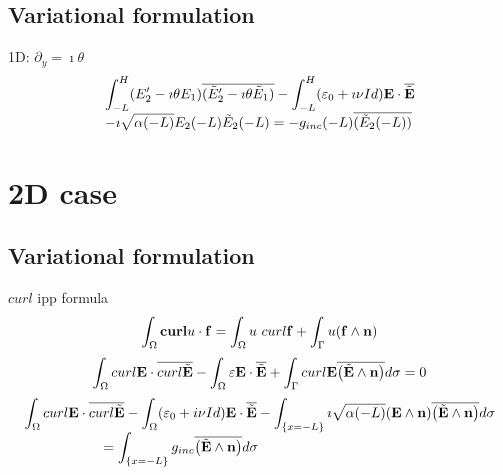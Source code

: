 \documentclass{article}
\newcommand{\be}{\begin{equation}}
\newcommand{\ee}{\end{equation}}
\newcommand{\E}{{\bf E}}
\newcommand{\n}{{\bf n}}
\newcommand{\f}{{\bf f}}
\newcommand{\curl}{{\bf curl}}
\newcommand{\eps}{{\bf \varepsilon}}
\begin{document}
\subsection{Variational formulation}
1D: $\partial_y = \imath \theta$
\be
\begin{array}{l}
\displaystyle \int_{-L}^H (E_2' -\imath\theta E_1)\overline{(\tilde E_2' -\imath \theta \tilde E_1)} - \int_{-L}^H (\eps_0 +\imath\nu Id) \E \cdot \overline{\tilde \E}
\\ \displaystyle  - \imath \sqrt{\alpha(-L)} E_2 (-L) \tilde E_2 (-L) = -g_{inc} (-L) \overline{( \tilde E_2(-L) )} 
\end{array}
\ee


\section{2D case}


\subsection{Variational formulation}
$curl$ ipp formula
\be
\int_\Omega \curl u \cdot \f = \int_\Omega u\ curl \f + \int_\Gamma u (\f \wedge \n)
\ee
\be
\int_\Omega curl \E \cdot \overline{curl \tilde \E} - \int_\Omega \eps \E \cdot \overline{\tilde \E} + \int _\Gamma curl \E \overline{\left( \tilde \E\wedge \n \right)} d\sigma = 0
\ee
\be
\begin{array}{l}
\displaystyle \int_\Omega curl \E \cdot \overline{curl \tilde \E} - \int_\Omega (\eps_0+i\nu Id) \E \cdot \overline{\tilde \E} - \int _{\{x=-L\}} \imath \sqrt{\alpha(-L)}(\E\wedge \n) \overline{\left( \tilde \E\wedge \n \right)} d\sigma 
\\ \displaystyle \phantom{ fffffffff}= \int_{\{x=-L\}} g_{inc}  \overline{\left( \tilde \E\wedge \n \right)} d\sigma
\end{array}\ee
\end{document}
